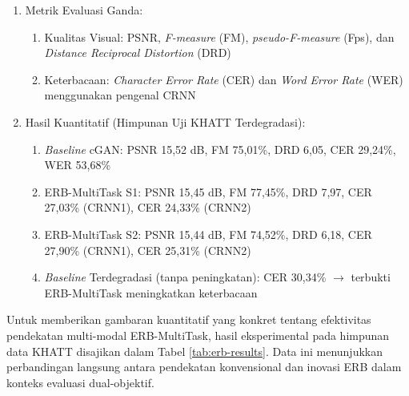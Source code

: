 \begin{enumerate}[leftmargin=*, labelindent=0pt, itemsep=1ex, topsep=0pt]
\begin{enumerate}[leftmargin=1.5em, labelsep=0.5em, itemindent=0pt, label=\arabic*., topsep=0pt, parsep=0pt, itemsep=0.5em]
      \item Metrik Evaluasi Ganda:
            \begin{enumerate}[leftmargin=1.5em, labelsep=0.5em, itemindent=0pt, noitemsep, topsep=0pt, label=\alph*.]
                  \item Kualitas Visual: PSNR, \textit{F-measure} (FM), \textit{pseudo-F-measure} (Fps), dan \textit{Distance Reciprocal Distortion} (DRD)
                  \item Keterbacaan: \textit{Character Error Rate} (CER) dan \textit{Word Error Rate} (WER) menggunakan pengenal CRNN
            \end{enumerate}

      \item Hasil Kuantitatif (Himpunan Uji KHATT Terdegradasi):
            \begin{enumerate}[leftmargin=1.5em, labelsep=0.5em, itemindent=0pt, noitemsep, topsep=0pt, label=\alph*.]
                  \item \textit{Baseline} cGAN: PSNR 15,52 dB, FM 75,01\%, DRD 6,05, CER 29,24\%, WER 53,68\%
                  \item ERB-MultiTask S1: PSNR 15,45 dB, FM 77,45\%, DRD 7,97, CER 27,03\% (CRNN1), CER 24,33\% (CRNN2)
                  \item ERB-MultiTask S2: PSNR 15,44 dB, FM 74,52\%, DRD 6,18, CER 27,90\% (CRNN1), CER 25,31\% (CRNN2)
                  \item \textit{Baseline} Terdegradasi (tanpa peningkatan): CER 30,34\% $\to$ terbukti ERB-MultiTask meningkatkan keterbacaan
            \end{enumerate}
\end{enumerate}

Untuk memberikan gambaran kuantitatif yang konkret tentang efektivitas pendekatan multi-modal ERB-MultiTask, hasil eksperimental pada himpunan data KHATT disajikan dalam Tabel \ref{tab:erb-results}. Data ini menunjukkan perbandingan langsung antara pendekatan konvensional dan inovasi ERB dalam konteks evaluasi dual-objektif.


\end{enumerate}
